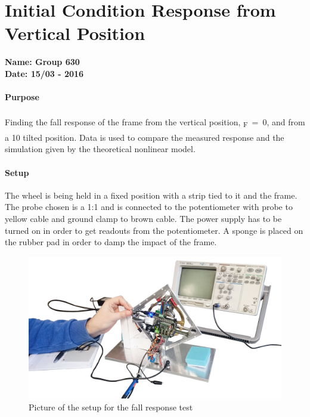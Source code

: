 \chapter{Initial Condition Response from Vertical Position}\label{app:fallResponseAppendix} 
\textbf{Name: Group 630}\\
\textbf{Date: 15/03 - 2016}

\subsubsection{Purpose}
Finding the fall response of the frame from the vertical position, \si{\theta_F=0^\circ}, and from a \si{10^\circ} tilted position.
Data is used to compare the measured response and the simulation given by the theoretical nonlinear model.

\subsubsection{Setup}
The wheel is being held in a fixed position with a strip tied to it and the frame. The probe chosen is a 1:1 and is connected to the potentiometer with probe to yellow cable and ground clamp to brown cable. The power supply has to be turned on in order to get readouts from the potentiometer. A sponge is placed on the rubber pad in order to damp the impact of the frame.
\begin{figure}[H]                                   
	\centering                                        
	\includegraphics[scale=0.3]{figures/stepResponseSetup2}
	\caption{Picture of the setup for the fall response test}
	\label{stepResponseTestPicture} 
\end{figure}              

